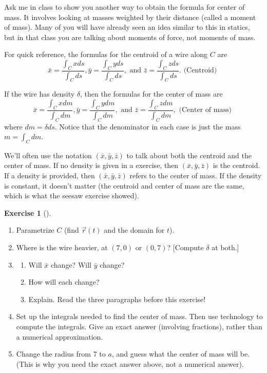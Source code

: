 \documentclass[10pt,]{book}
\theoremstyle{plain}
\theoremstyle{definition}
\theoremstyle{definition}
\theoremstyle{definition}
\theoremstyle{definition}
\newtheorem{exploration}[project]{Exercise}
\theoremstyle{definition}
\numberwithin{equation}{section}
\begin{document}
Ask me in class to show you another way to obtain the formula for center of mass. It involves looking at masses weighted by their distance (called a moment of mass). Many of you will have already seen an idea similar to this in statics, but in that class you are talking about moments of force, not moments of mass.%
\par
For quick reference, the formulas for the centroid of a wire along \(C\) are%
\begin{equation*}
\bar x = \frac{\int_C x ds}{\int_C  ds},
\bar y = \frac{\int_C y ds}{\int_C  ds}, 
\text{ and } 
\bar z = \frac{\int_C z ds}{\int_C  ds}.  \text{ (Centroid) }
\end{equation*}
%
\par
If the wire has density \(\delta\), then the formulas for the center of mass are %
\begin{equation*}
\bar x = \frac{\int_C x dm}{\int_C  dm},
\bar y = \frac{\int_C y dm}{\int_C  dm}, 
\text{ and } 
\bar z = \frac{\int_C z dm}{\int_C  dm},  \text{ (Center of mass) }
\end{equation*}
where \(dm=\delta ds\). Notice that the denominator in each case is just the mass \(m=\int_C dm\).%
\par
We'll often use the notation \((\bar x, \bar y,\bar z)\) to talk about both the centroid and the center of mass. If no density is given in a exercise, then \((\bar x, \bar y,\bar z)\) is the centroid. If a density is provided, then \((\bar x, \bar y,\bar z)\) refers to the center of mass. If the density is constant, it doesn't matter (the centroid and center of mass are the same, which is what the seesaw exercise showed).%
\begin{exploration}[]\label{exploration-222}
\leavevmode%
\begin{enumerate}[font=\bfseries,label=(\alph*),ref=\alph*]
\item\label{task-577} Parametrize \(C\) (find \(\vec r(t)\) and the domain for \(t\)).%
\item\label{task-578} Where is the wire heavier, at \((7,0)\) or \((0,7)\)? [Compute \(\delta\) at both.]%
\item\label{task-579} \begin{enumerate}[font=\bfseries,label=(\roman*),ref=\theenumi.\roman*]
\item\label{task-580} Will \(\bar x\) change? Will \(\bar y\) change?%
\item\label{task-581} How will each change?%
\item\label{task-582} Explain. Read the three paragraphs before this exercise!%
%
\end{enumerate}
\item\label{task-583} Set up the integrals needed to find the center of mass. Then use technology to compute the integrals. Give an exact answer (involving fractions), rather than a numerical approximation.%
\item\label{task-584} Change the radius from 7 to \(a\), and guess what the center of mass will be.  (This is why you need the exact answer above, not a numerical answer).%
\end{enumerate}
\end{exploration}
\end{document}
